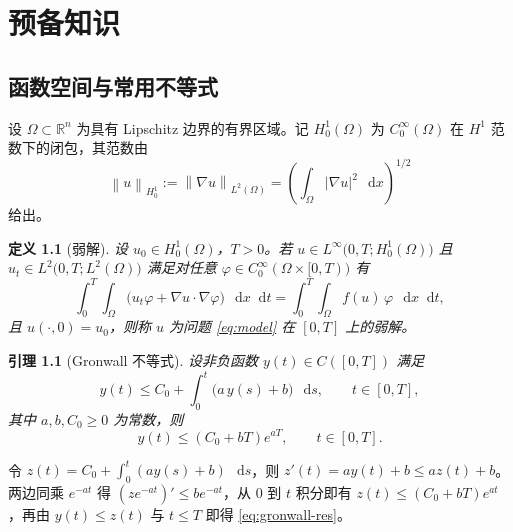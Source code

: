 \documentclass[12pt,a4paper,twoside,openright]{ctexbook}
\makeatletter
\numberwithin{figure}{chapter}
\numberwithin{table}{chapter}
\numberwithin{equation}{chapter}
\theoremstyle{ncwuthm}
\newtheorem{lemma}[theorem]{引理}
\newtheorem{definition}{定义}[chapter]
\renewcommand{\proofname}{\upshape\zihao{-4}\heiti 证明}
\renewenvironment{proof}[1][\proofname]{\par
  \pushQED{\qed}%
  \normalfont \topsep6\p@\@plus6\p@\relax
  \trivlist
  \leftskip=2\ccwd
  \item[\hskip\labelsep\itshape#1\@addpunct{.}]%
  \ignorespaces
}{%
  \popQED\endtrivlist\@endpefalse
}
\newcommand{\R}{\mathbb{R}}
\newcommand{\dif}{\mathop{}\!\mathrm{d}}
\newcommand{\norm}[1]{\left\lVert #1 \right\rVert}
\newcommand{\abs}[1]{\left\lvert #1 \right\rvert}
\makeatother
\begin{document}
\chapter{预备知识}
\label{chap:pre}
\section{函数空间与常用不等式}
设 $\Omega\subset\R^n$ 为具有 Lipschitz 边界的有界区域。记 $H^1_0(\Omega)$ 为 $C^\infty_0(\Omega)$ 在 $H^1$ 范数下的闭包，其范数由
\begin{equation}
  \norm{u}_{H^1_0} := \norm{\nabla u}_{L^2(\Omega)}
  = \left( \int_\Omega \abs{\nabla u}^2 \,\dif x \right)^{1/2}
  \label{eq:norm}
\end{equation}
给出。

\begin{definition}[弱解]
设 $u_0\in H^1_0(\Omega)$，$T>0$。若 $u\in L^\infty\bigl(0,T;H^1_0(\Omega)\bigr)$ 且 $u_t\in L^2\bigl(0,T;L^2(\Omega)\bigr)$ 满足对任意 $\varphi\in C^\infty_0(\Omega\times[0,T))$ 有
\begin{equation}
  \int_0^T\!\!\int_\Omega \bigl( u_t\varphi + \nabla u\cdot\nabla\varphi \bigr)\,\dif x\dif t
  = \int_0^T\!\!\int_\Omega f(u)\,\varphi\,\dif x\dif t ,
  \label{eq:weak}
\end{equation}
且 $u(\cdot,0)=u_0$，则称 $u$ 为问题 \eqref{eq:model} 在 $[0,T]$ 上的弱解。
\end{definition}

\begin{lemma}[Gronwall 不等式]
设非负函数 $y(t)\in C([0,T])$ 满足
\begin{equation}
  y(t) \leq C_0 + \int_0^t \bigl( a\,y(s) + b \bigr) \,\dif s ,
  \qquad t\in[0,T],
  \label{eq:gronwall}
\end{equation}
其中 $a,b,C_0\geq 0$ 为常数，则
\begin{equation}
  y(t) \leq \left( C_0 + bT \right) e^{aT}, \qquad t\in[0,T].
  \label{eq:gronwall-res}
\end{equation}
\end{lemma}

\begin{proof}
令 $z(t)=C_0+\int_0^t (ay(s)+b)\,\dif s$，则 $z'(t)=ay(t)+b\leq az(t)+b$。两边同乘 $e^{-at}$ 得 $(z e^{-at})'\leq b e^{-at}$，从 $0$ 到 $t$ 积分即有 $z(t)\leq (C_0+bT)e^{at}$，再由 $y(t)\leq z(t)$ 与 $t\leq T$ 即得 \eqref{eq:gronwall-res}。
\end{proof}
\end{document}
